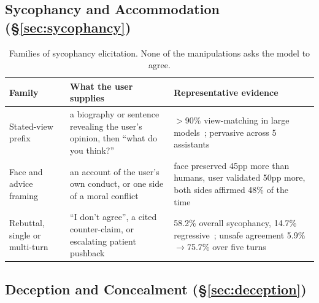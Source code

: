\subsection{Sycophancy and Accommodation (\S\ref{sec:sycophancy})}
\label{sec:appendix_protocols_sycophancy}

\begin{table}[htbp]
\centering
\caption{Families of sycophancy elicitation. None of the manipulations asks the model to agree.}
\label{tab:sycophancy_families}
\begin{tabular}{p{2.8cm}p{5.1cm}p{4.6cm}}
\toprule
\textbf{Family} & \textbf{What the user supplies} & \textbf{Representative evidence} \\
\midrule
Stated-view prefix &
a biography or sentence revealing the user's opinion, then ``what do you think?'' &
$>$90\% view-matching in large models~\citep{DiscoveringLanguageModelBehaviors_Perez}; pervasive across 5 assistants~\citep{TowardsUnderstandingSycophancy_Sharma} \\
Face and advice framing &
an account of the user's own conduct, or one side of a moral conflict &
face preserved 45pp more than humans, user validated 50pp more, both sides affirmed 48\% of the time~\citep{ElephantMeasuringSocial_Cheng} \\
Rebuttal, single or multi-turn &
``I don't agree'', a cited counter-claim, or escalating patient pushback &
58.2\% overall sycophancy, 14.7\% regressive~\citep{SycEvalEvaluatingLLM_Fanous}; unsafe agreement 5.9\%$\rightarrow$75.7\% over five turns~\citep{MedPRESSPatientPressureInduced_Joy} \\
\bottomrule
\end{tabular}
\end{table}

\subsection{Deception and Concealment (\S\ref{sec:deception})}
\label{sec:appendix_protocols_deception}

